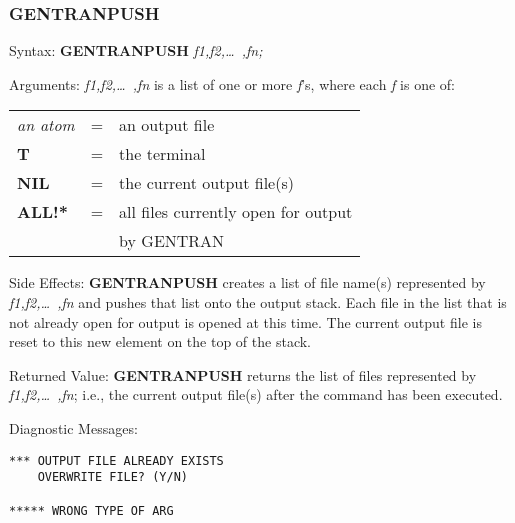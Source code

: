 \subsubsection{GENTRANPUSH}
\begin{describe}{Syntax:}
{\bf GENTRANPUSH} {\it f1,f2,\dots\ ,fn;}
\end{describe}
\begin{describe}{Arguments:}
{\it f1,f2,\dots\ ,fn\/} is a list of one or more {\it f\/}'s, where each
{\it f\/} is one of:
\begin{center}
\begin{tabular}{lll}
{\it an atom} & = & an output file\\
{\bf T} & = & the terminal\\
{\bf NIL} & = & the current output file(s)\\
{\bf ALL!*} & = & all files currently open for output \\
& & by GENTRAN\\
\end{tabular}
\end{center}
\end{describe}
\begin{describe}{Side Effects:}
{\bf GENTRANPUSH} creates a list of file name(s) represented by
{\it f1,f2,\dots\ ,fn\/} and pushes that list onto the output stack.  Each file
in the list that is not already open for output is opened at this time.  The
current output file is reset to this new element on the top of the stack.
\end{describe}
\begin{describe}{Returned Value:}
{\bf GENTRANPUSH} returns the list of files represented by
{\it f1,f2,\dots\ ,fn\/};
i.e., the current output file(s) after the command has been executed.
\end{describe}
\begin{describe}{Diagnostic Messages:}
\begin{verbatim}
*** OUTPUT FILE ALREADY EXISTS
    OVERWRITE FILE? (Y/N)

***** WRONG TYPE OF ARG
\end{verbatim}
\end{describe}
